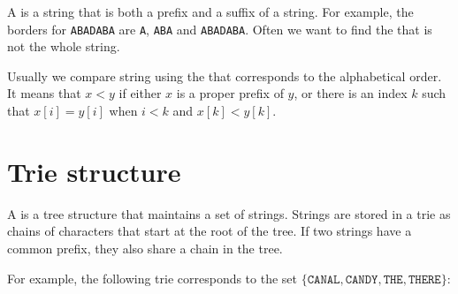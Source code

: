 
A  is a string that is both
a prefix and a suffix of a string.
For example, the borders for \texttt{ABADABA}
are \texttt{A}, \texttt{ABA} and \texttt{ABADABA}.
Often we want to find the 
that is not the whole string.


Usually we compare string using the 
that corresponds to the alphabetical order.
It means that $x<y$ if either $x$ is a proper prefix of $y$,
or there is an index $k$ such that
$x[i]=y[i]$ when $i<k$ and $x[k]<y[k]$.

\section{Trie structure}


A  is a tree structure that
maintains a set of strings.
Strings are stored in a trie as chains
of characters that start at the root
of the tree.
If two strings have a common prefix,
they also share a chain in the tree.

For example, the following trie corresponds
to the set
$\{\texttt{CANAL},\texttt{CANDY},\texttt{THE},\texttt{THERE}\}$:

